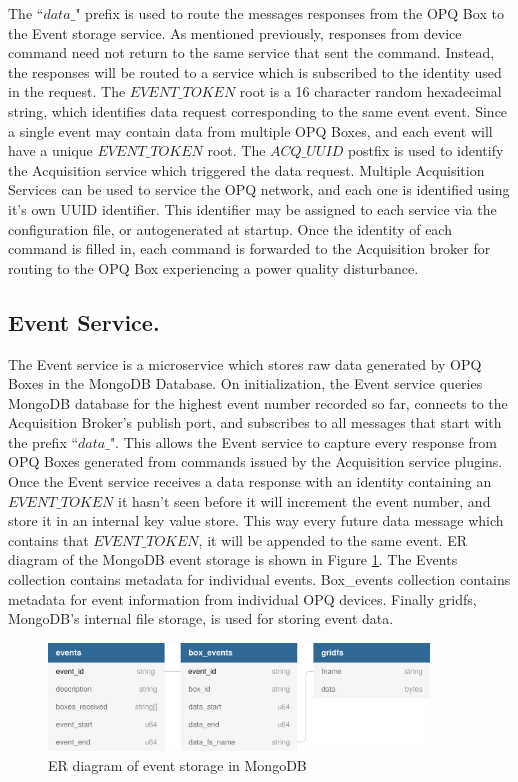 The ``$data\_$" prefix is used to route the messages responses from the OPQ Box to the Event storage service.
As mentioned previously, responses from device command need not return to the same service that sent the command.
Instead, the responses will be routed to a service which is subscribed to the identity used in the request.
The $EVENT\_TOKEN$ root is a 16 character random hexadecimal string, which identifies data request corresponding to the same event event.
Since a single event may contain data from multiple OPQ Boxes, and each event will have a unique $EVENT\_TOKEN$ root.
The $ACQ\_UUID$ postfix is used to identify the Acquisition service which triggered the data request.
Multiple Acquisition Services can be used to service the OPQ network, and each one is identified using it's own UUID identifier.
This identifier may be assigned to each service via the configuration file, or autogenerated at startup.
Once the identity of each command is filled in, each command is forwarded to the Acquisition broker for routing to the OPQ Box experiencing a power quality disturbance.

\subsection{Event Service.}\label{subsec:event-service}

The Event service is a microservice which stores raw data generated by OPQ Boxes in the MongoDB Database.
On initialization, the Event service queries MongoDB database for the highest event number recorded so far, connects to the Acquisition Broker's publish port,
and subscribes to all messages that start with the prefix ``$data\_$".
This allows the Event service to capture every response from OPQ Boxes generated from commands issued by the Acquisition service plugins.
Once the Event service receives a data response with an identity containing an $EVENT\_TOKEN$ it hasn't seen before it will increment the event number, and
store it in an internal key value store.
This way every future data message which contains that $EVENT\_TOKEN$, it will be appended to the same event.
ER diagram of the MongoDB event storage is shown in Figure \ref{fig:opq:mongo_er}.
The Events collection contains metadata for individual events.
Box\_events collection contains metadata for event information from individual OPQ devices.
Finally gridfs, MongoDB's internal file storage, is used for storing event data.

\begin{figure}[h]
	\begin{center}
		\includegraphics[width=0.9\textwidth]{img/mongo_event_storage.pdf}
	\end{center}
	\caption{ER diagram of event storage in MongoDB}
	\label{fig:opq:mongo_er}
\end{figure}

